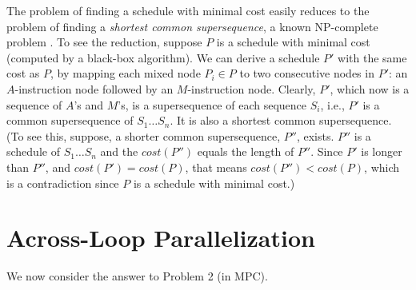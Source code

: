 \documentclass[sigconf, screen, natbib=false, dvipsnames, table]{acmart}
\theoremstyle{definition}
\begin{document}
The problem of finding a schedule with minimal cost 
easily reduces to the problem of finding a \emph{shortest common supersequence}, 
a known NP-complete problem . To see the reduction, 
suppose $P$ is a schedule with minimal cost (computed by a black-box algorithm). 
We can derive a schedule $P'$ with the same cost as $P$, by mapping each mixed node $P_i \in P$ 
to two consecutive nodes in $P'$: an $A$-instruction node followed by an $M$-instruction node.
Clearly, $P'$, which now is a sequence of $A$'s and $M$'s, is a supersequence of each sequence 
$S_i$, i.e., $P'$ is a common supersequence 
of $S_1 \dots S_n$. It is also a shortest common supersequence. (To see this, suppose, a 
shorter common supersequence, $P''$, exists. $P''$ is a schedule of $S_1 \dots S_n$
and the $\mathit{cost}(P'')$ equals the length of $P''$. Since $P'$ is longer than
$P''$, and $\mathit{cost}(P') = \mathit{cost}(P)$, that means $\mathit{cost}(P'') < \mathit{cost}(P)$, 
which is a contradiction since $P$ is a schedule with minimal cost.)




\section{Across-Loop Parallelization} 
\label{sec:optimal_loop_parallelization}
%

We now consider the answer to Problem 2 (in MPC). 

\end{document}
